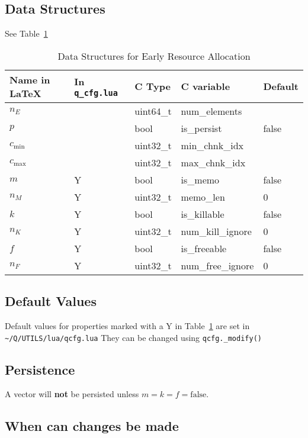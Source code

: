 \documentclass[letterpaper,12pt]{article}
\begin{document}
\subsection{Data Structures}
See Table~\ref{tbl_data_structures}

\begin{table}
  \centering
  \begin{tabular}{|l|l|l|l|l|} \hline \hline 
    {\bf Name in \LaTeX} & {\bf In} {\tt q\_cfg.lua} & {\bf C Type} & {\bf C variable} & {\bf Default} \\ \hline \hline 
    \(n_E\) & & uint64\_t & num\_elements & \\ \hline 
    \(p\) & & bool & is\_persist & false \\ \hline
     \(c_{\mathrm{min}}\) & & uint32\_t & min\_chnk\_idx & \\ \hline 
     \(c_{\mathrm{max}}\) & & uint32\_t & max\_chnk\_idx & \\ \hline 
    \(m\) & Y & bool & is\_memo & false \\ \hline
    \(n_M\) & Y & uint32\_t & memo\_len & 0 \\ \hline 
    \(k\) & Y & bool & is\_killable & false \\ \hline
    \(n_K\) & Y & uint32\_t & num\_kill\_ignore & 0 \\ \hline 
    \(f\) & Y & bool & is\_freeable & false \\ \hline
    \(n_F\) & Y & uint32\_t & num\_free\_ignore & 0 \\ \hline 
    \hline
  \end{tabular}
  \caption{Data Structures for Early Resource Allocation}
  \label{tbl_data_structures}
\end{table}

\subsection{Default Values}
Default values for properties marked with a Y in Table~\ref{tbl_data_structures}
are set in \verb+~/Q/UTILS/lua/qcfg.lua+
They can be changed using \verb+qcfg._modify()+ 
\subsection{Persistence}
A vector will {\bf not} be persisted unless \(m = k = f = \mathrm{false}\).

\subsection{When can changes be made}
\end{document}

